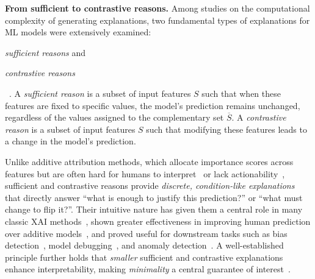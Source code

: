 \documentclass{article}
\begin{document}
\textbf{From sufficient to contrastive reasons.} Among studies on the computational complexity of generating explanations, two fundamental types of explanations for ML models were extensively examined: \begin{inparaenum}[(i)]
\item \emph{sufficient reasons} and \item \emph{contrastive reasons}\end{inparaenum}~\citep{BaMoPeSu20, arenas2022computing, audemard2022preferred, ArBaBaPeSu21, barcelo2025explaining, marques2022delivering, ignatiev2020contrastive, darwiche2020reasons}. %
A \emph{sufficient reason} is a subset of input features $S$ such that when these features are fixed to specific values, the model's prediction remains unchanged, regardless of the values assigned to the complementary set $ \overline{S}$. %
A \emph{contrastive reason} is a subset of input features $S$ such that modifying these features %
leads to a change in the model's prediction.  

Unlike additive attribution methods, which allocate importance scores across features but are often hard for humans to interpret~\citep{kumar2020problems} or lack actionability~\citep{bilodeau2024impossibility}, sufficient and contrastive reasons provide \emph{discrete, condition-like explanations} that directly answer ``what is enough to justify this prediction?'' or ``what must change to flip it?''. Their intuitive nature has given them a central role in many classic XAI methods~\citep{ribeiro2018anchors, carter2019made, ignatiev2019abduction, dhurandhar2018explanations}, shown greater effectiveness in improving human prediction over additive models~\citep{ribeiro2018anchors, yin2022interpreting, dhurandhar2018explanations}, and proved useful for downstream tasks such as bias detection~\citep{balkir2022necessity, carter2021overinterpretation, la2021guaranteed, muthukumar2018understanding}, model debugging~\citep{jacovi2021contrastive}, and anomaly detection~\citep{davidsoncxad}.
A well-established principle further holds that \emph{smaller} sufficient and contrastive explanations enhance interpretability, making \emph{minimality} a central guarantee of interest~\citep{ribeiro2018anchors, lopardo2023sea, carter2019made, BaMoPeSu20, arenas2022computing, blanc2021provably, waldchen2021computational}.
\end{document}
